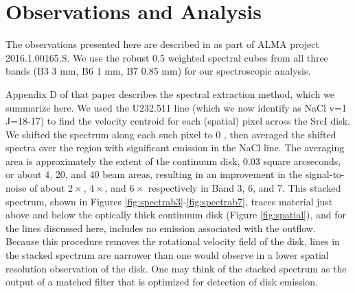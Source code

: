 \documentclass[twocolumn]{aastex62}
\newcommand{\sourcei}{SrcI\xspace}
\begin{document}
\section{Observations and Analysis}



The observations presented here are described in \citet{Ginsburg2018b} as part
of ALMA project 2016.1.00165.S.  We use the robust 0.5 weighted spectral cubes
from all three bands (B3 3 mm, B6 1 mm, B7 0.85 mm) for our spectroscopic analysis.

Appendix D of that paper describes the spectral extraction method,
which we summarize here.  We used the U232.511 line (which we now identify as
NaCl v=1 J=18-17) to find the velocity centroid for each (spatial) pixel
across the \sourcei disk.  We shifted the spectrum along
each such pixel to 0 \kms, then averaged the shifted spectra over the region with
significant emission in the NaCl line.  
The
averaging area is approximately the extent of the continuum disk, 0.03 square
arcseconds, or about 4, 20, and 40  beam areas, resulting
in an improvement in the signal-to-noise of about $2\times$, $4\times$, and $6\times$
respectively in Band 3, 6, and 7.
This stacked spectrum, shown in Figures \ref{fig:spectrab3}-\ref{fig:spectrab7},
traces material just above and below the optically thick continuum disk
(Figure \ref{fig:spatial}), and for the lines discussed here, includes no
emission associated with the outflow.  
Because this procedure removes the rotational velocity field of the disk,
lines in the stacked spectrum are narrower than one would observe in
a lower spatial resolution observation of the disk.  One may think of the
stacked spectrum as the output of a matched filter that is optimized for
detection of disk emission.
\end{document}
